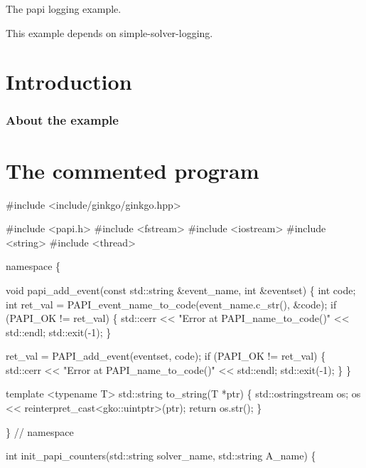 The papi logging example.

This example depends on simple-\/solver-\/logging.

 \label{_Intro}%
 \label{_Introduction}%
\section*{Introduction}

\label{_Abouttheexample}%
\subsubsection*{About the example }

\label{_CommProg}%
 \section*{The commented program}


\begin{DoxyCode}
\textcolor{preprocessor}{#include <include/ginkgo/ginkgo.hpp>}


\textcolor{preprocessor}{#include <papi.h>}
\textcolor{preprocessor}{#include <fstream>}
\textcolor{preprocessor}{#include <iostream>}
\textcolor{preprocessor}{#include <string>}
\textcolor{preprocessor}{#include <thread>}


\textcolor{keyword}{namespace }\{


\textcolor{keywordtype}{void} papi\_add\_event(\textcolor{keyword}{const} std::string &event\_name, \textcolor{keywordtype}{int} &eventset)
\{
    \textcolor{keywordtype}{int} code;
    \textcolor{keywordtype}{int} ret\_val = PAPI\_event\_name\_to\_code(event\_name.c\_str(), &code);
    \textcolor{keywordflow}{if} (PAPI\_OK != ret\_val) \{
        std::cerr << \textcolor{stringliteral}{"Error at PAPI\_name\_to\_code()"} << std::endl;
        std::exit(-1);
    \}

    ret\_val = PAPI\_add\_event(eventset, code);
    \textcolor{keywordflow}{if} (PAPI\_OK != ret\_val) \{
        std::cerr << \textcolor{stringliteral}{"Error at PAPI\_name\_to\_code()"} << std::endl;
        std::exit(-1);
    \}
\}


\textcolor{keyword}{template} <\textcolor{keyword}{typename} T>
std::string to\_string(T *ptr)
\{
    std::ostringstream os;
    os << reinterpret\_cast<gko::uintptr>(ptr);
    \textcolor{keywordflow}{return} os.str();
\}


\}  \textcolor{comment}{// namespace}


\textcolor{keywordtype}{int} init\_papi\_counters(std::string solver\_name, std::string A\_name)
\{
\end{DoxyCode}



